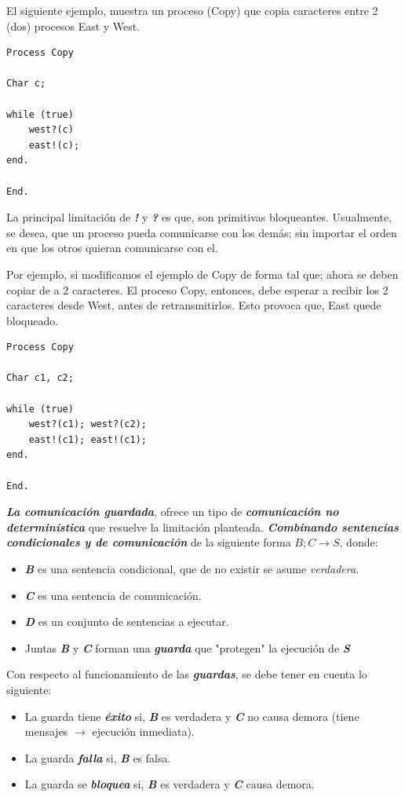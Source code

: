 \documentclass[a4paper, 10pt]{report}
\begin{document}
El siguiente ejemplo, muestra un proceso (Copy) que copia caracteres entre 2 (dos) procesos East y West.

\begin{lstlisting}
Process Copy

Char c;

while (true)
    west?(c)
    east!(c);
end.

End.
\end{lstlisting}

La principal limitación de \textbf{\emph{!}} y \textbf{\emph{?}} es que, son primitivas bloqueantes. Usualmente, se desea, que un proceso pueda comunicarse con los demás; sin importar el orden en que los otros quieran comunicarse con el.

Por ejemplo, si modificamos el ejemplo de Copy de forma tal que; ahora se deben copiar de a 2 caracteres. El proceso Copy, entonces, debe esperar a recibir los 2 caracteres desde West, antes de retransmitirlos. Esto provoca que, East quede bloqueado.

\begin{lstlisting}
Process Copy

Char c1, c2;

while (true)
    west?(c1); west?(c2);
    east!(c1); east!(c1);
end.

End.
\end{lstlisting}

\textbf{\emph{La comunicación guardada}}, ofrece un tipo de \textbf{\emph{comunicación no determinística}} que resuelve la limitación planteada. \textbf{\emph{Combinando sentencias condicionales y de comunicación}} de la siguiente forma $B; C \rightarrow S $, donde:

\begin{itemize}
    \item \textbf{\emph{B}} es una sentencia condicional, que de no existir se asume \emph{verdadera}.
    \item \textbf{\emph{C}} es una sentencia de comunicación.
    \item \textbf{\emph{D}} es un conjunto de sentencias a ejecutar.
    \item Juntas \textbf{\emph{B}} y \textbf{\emph{C}} forman una \textbf{\emph{guarda}} que "protegen" la ejecución de \textbf{\emph{S}}
\end{itemize}

Con respecto al funcionamiento de las \textbf{\emph{guardas}}, se debe tener en cuenta lo siguiente:

\begin{itemize}
    \item La guarda tiene \textbf{\emph{éxito}} si, \textbf{\emph{B}} es verdadera y \textbf{\emph{C}} no causa demora (tiene mensajes $\rightarrow$ ejecución inmediata).
    \item La guarda \textbf{\emph{falla}} si, \textbf{\emph{B}} es falsa.
    \item La guarda se \textbf{\emph{bloquea}} si, \textbf{\emph{B}} es verdadera y \textbf{\emph{C}} causa demora.
\end{itemize}
\end{document}

